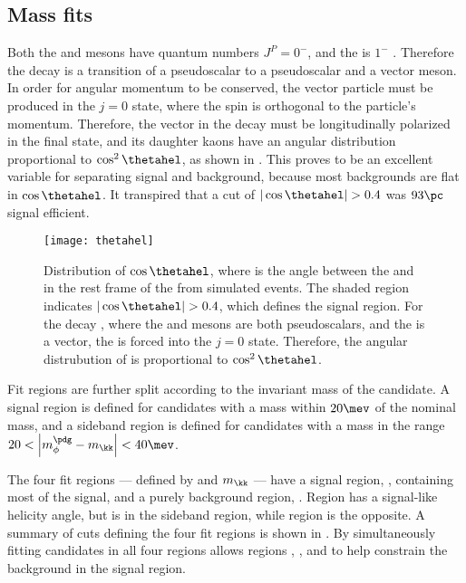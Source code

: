 \subsection{Mass fits}
\label{sec:dsphi:fit}
Both the \Bp and \Ds mesons have quantum numbers $J^P=0^-$, and the \phii is $1^-$ .
Therefore the decay \btodsphi is a transition of a pseudoscalar to a pseudoscalar and a vector
meson.
In order for angular momentum to be conserved, the vector particle must be produced in the $j=0$
state, where the spin is orthogonal to the particle's momentum.
Therefore, the vector \phii in the decay \btodsphi must be longitudinally polarized in the final
state, and its daughter kaons have an angular distribution proportional to $\cos^2\thetahel$, as
shown in .
This proves to be an excellent variable for separating signal and background, because most
backgrounds are flat in $\cos\thetahel$.
It transpired that a cut of $|\cos\thetahel|>0.4$ was $93\pc$ signal efficient.

\begin{figure}
  \begin{center}
    \texttt{[image: thetahel]}
    \caption[Distribution of \thetahel in \btodsphi]
    {\small
      Distribution of $\cos\thetahel$, where \thetahel is the angle between the \Bp and \Kp in the
      rest frame of the \phii from simulated events.
      The shaded region indicates $|\cos\thetahel|>0.4$, which defines the signal region.
      For the decay \btodsphi, where the \Bp and \Ds mesons are both pseudoscalars, and the
      \phii is a vector, the \phii is forced into the $j=0$ state.
      Therefore, the angular distrubution of \thetahel is proportional to $\cos^2\thetahel$.
    }
    \label{fig:dsphi:hel}
  \end{center}
\end{figure}

Fit regions are further split according to the invariant mass of the \phii candidate.
A signal region is defined for \phitokk candidates with a mass within $20\mev$ of the nominal \phii
mass, and a sideband region is defined for candidates with a mass in the range
\mbox{$20<\left|m_\phi^\pdg-m_\kk\right|<40\mev$}.

The four fit regions --- defined by \thetahel and $m_{\kk}$ --- have a signal region, \rA,
containing most of the signal, and a purely background region, \rD.
Region \rB has a signal-like helicity angle, but is in the \phii sideband region, while region \rC
is the opposite.
A summary of cuts defining the four fit regions is shown in .
By simultaneously fitting \btodsphi candidates in all four regions allows regions \rB, \rC, and \rD
to help constrain the background in the signal region.

